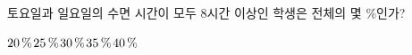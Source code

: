 토요일과 일요일의 수면 시간이 모두 8시간 이상인 학생은 전체의 몇 \%인가?
\begin{choices32}{$20\mkern3mu \%$}{$25\mkern3mu \%$}{$30\mkern3mu \%$}{$35\mkern3mu \%$}{$40\mkern3mu \%$}\end{choices32}
